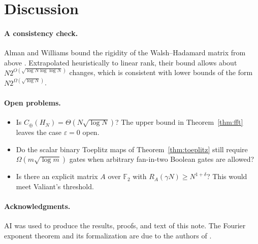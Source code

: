 \documentclass[11pt]{article}
\theoremstyle{definition}
\theoremstyle{remark}
\newcommand{\F}{\mathbb{F}}
\newcommand{\Cx}{C_{\oplus}}
\begin{document}
\section{Discussion}

\paragraph{A consistency check.}
Alman and Williams bound the rigidity of the Walsh--Hadamard matrix from
above \cite{AW17}. Extrapolated heuristically to linear rank, their bound
allows about $N2^{O(\sqrt{\log N\log\log N})}$ changes, which is consistent
with lower bounds of the form $N2^{\Omega(\sqrt{\log N})}$.

\paragraph{Open problems.}
\begin{itemize}
\item Is $\Cx(H_N)=\Theta(N\sqrt{\log N})$? The upper bound in
Theorem~\ref{thm:fft} leaves the case $\varepsilon=0$ open.
\item Do the scalar binary Toeplitz maps of Theorem~\ref{thm:toeplitz}
still require $\Omega(m\sqrt{\log m})$ gates when arbitrary fan-in-two
Boolean gates are allowed?
\item Is there an explicit matrix $A$ over $\F_2$ with
$R_A(\gamma N)\ge N^{1+\delta}$? This would meet Valiant's threshold.
\end{itemize}

\paragraph{Acknowledgments.}
AI was used to produce the results, proofs, and text of this note.
The Fourier exponent theorem and its formalization are due to the
authors of \cite{FFT,Lean}.
\end{document}
